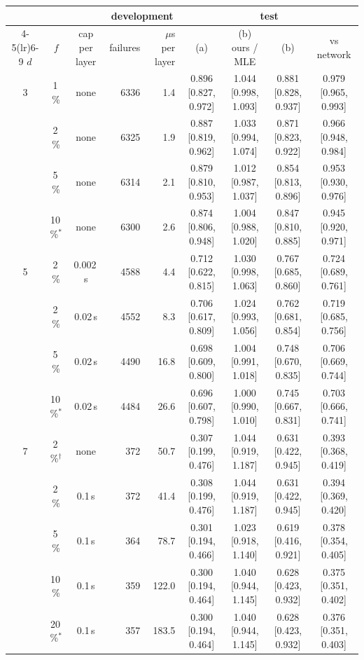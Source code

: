 \begin{tabular}{@{}cccrrcccc@{}}
\toprule
& & & \multicolumn{2}{c}{development} & \multicolumn{4}{c}{test} \\
\cmidrule(lr){4-5}\cmidrule(lr){6-9}
$d$ & $f$ & cap per layer & failures & $\mu$s per layer & (a) & (b) ours / MLE & (b) & vs network \\
\midrule
3 & 1\,\% & none & 6336 & 1.4 & 0.896 [0.827, 0.972] & 1.044 [0.998, 1.093] & 0.881 [0.828, 0.937] & 0.979 [0.965, 0.993] \\
 & 2\,\% & none & 6325 & 1.9 & 0.887 [0.819, 0.962] & 1.033 [0.994, 1.074] & 0.871 [0.823, 0.922] & 0.966 [0.948, 0.984] \\
 & 5\,\% & none & 6314 & 2.1 & 0.879 [0.810, 0.953] & 1.012 [0.987, 1.037] & 0.854 [0.813, 0.896] & 0.953 [0.930, 0.976] \\
 & 10\,\%$^{\ast}$ & none & 6300 & 2.6 & 0.874 [0.806, 0.948] & 1.004 [0.988, 1.020] & 0.847 [0.810, 0.885] & 0.945 [0.920, 0.971] \\
\midrule
5 & 2\,\% & 0.002\,s & 4588 & 4.4 & 0.712 [0.622, 0.815] & 1.030 [0.998, 1.063] & 0.767 [0.685, 0.860] & 0.724 [0.689, 0.761] \\
 & 2\,\% & 0.02\,s & 4552 & 8.3 & 0.706 [0.617, 0.809] & 1.024 [0.993, 1.056] & 0.762 [0.681, 0.854] & 0.719 [0.685, 0.756] \\
 & 5\,\% & 0.02\,s & 4490 & 16.8 & 0.698 [0.609, 0.800] & 1.004 [0.991, 1.018] & 0.748 [0.670, 0.835] & 0.706 [0.669, 0.744] \\
 & 10\,\%$^{\ast}$ & 0.02\,s & 4484 & 26.6 & 0.696 [0.607, 0.798] & 1.000 [0.990, 1.010] & 0.745 [0.667, 0.831] & 0.703 [0.666, 0.741] \\
\midrule
7 & 2\,\%$^{\dagger}$ & none & 372 & 50.7 & 0.307 [0.199, 0.476] & 1.044 [0.919, 1.187] & 0.631 [0.422, 0.945] & 0.393 [0.368, 0.419] \\
 & 2\,\% & 0.1\,s & 372 & 41.4 & 0.308 [0.199, 0.476] & 1.044 [0.919, 1.187] & 0.631 [0.422, 0.945] & 0.394 [0.369, 0.420] \\
 & 5\,\% & 0.1\,s & 364 & 78.7 & 0.301 [0.194, 0.466] & 1.023 [0.918, 1.140] & 0.619 [0.416, 0.921] & 0.378 [0.354, 0.405] \\
 & 10\,\% & 0.1\,s & 359 & 122.0 & 0.300 [0.194, 0.464] & 1.040 [0.944, 1.145] & 0.628 [0.423, 0.932] & 0.375 [0.351, 0.402] \\
 & 20\,\%$^{\ast}$ & 0.1\,s & 357 & 183.5 & 0.300 [0.194, 0.464] & 1.040 [0.944, 1.145] & 0.628 [0.423, 0.932] & 0.376 [0.351, 0.403] \\
\bottomrule
\end{tabular}
